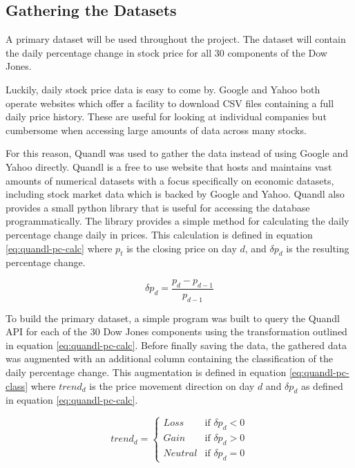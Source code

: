 \documentclass{report}
\begin{document}
\subsection{Gathering the Datasets}

A primary dataset will be used throughout the project. The dataset will contain the daily percentage change in stock price for all 30 components of the Dow Jones.

Luckily, daily stock price data is easy to come by. Google and Yahoo both operate websites which offer a facility to download CSV files containing a full daily price history. These are useful for looking at individual companies but cumbersome when accessing large amounts of data across many stocks. 

For this reason, Quandl\cite{website:quandl} was used to gather the data instead of using Google and Yahoo directly. Quandl is a free to use website that hosts and maintains vast amounts of numerical datasets with a focus specifically on economic datasets, including stock market data which is backed by Google and Yahoo. Quandl also provides a small python library that is useful for accessing the database programmatically. The library provides a simple method for calculating the daily percentage change daily in prices. This calculation is defined in equation \ref{eq:quandl-pc-calc} where $p_{t}$ is the closing price on day $d$, and $\delta p_{d}$ is the resulting percentage change.  

\begin{figure}[H]
\begin{center}
    \begin{equation}
      \delta p_{d} = \dfrac{p_{d} - p_{d-1}} {p_{d-1}}
      \label{eq:quandl-pc-calc}
    \end{equation}
\end{center}
\end{figure}

To build the primary dataset, a simple program was built to query the Quandl API for each of the 30 Dow Jones components using the transformation outlined in equation \ref{eq:quandl-pc-calc}. Before finally saving the data, the gathered data was augmented with an additional column containing the classification of the daily percentage change. This augmentation is defined in equation \ref{eq:quandl-pc-class} where $trend_{d}$ is the price movement direction on day $d$ and $\delta p_{d}$ as defined in equation \ref{eq:quandl-pc-calc}.

\begin{figure}[H]
\begin{center}
\begin{equation}
trend_{d} = \begin{cases}
Loss &\text{if $\delta p_{d} < 0$}\\
Gain &\text{if $\delta p_{d} > 0$}\\
Neutral &\text{if $\delta p_{d} = 0$}
\end{cases}
\label{eq:quandl-pc-class}
\end{equation}
\end{center}
\end{figure}
\end{document}
